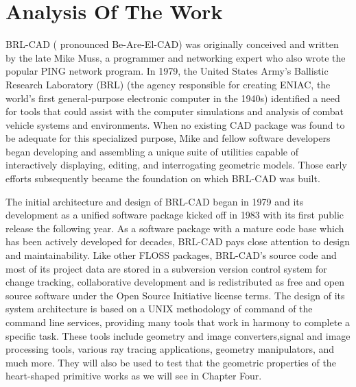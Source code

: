 
\section{Analysis Of The Work}

\hspace{30} BRL­-CAD   (   pronounced   Be­-Are-­El-­CAD)   was   originally   conceived   and  
written   by   the   late   Mike   Muss,   a   programmer   and   networking   expert   who   also  
wrote   the   popular   PING   network   program.   In   1979,   the   United   States   Army's  
Ballistic   Research   Laboratory   (BRL)   (the   agency   responsible   for   creating  
ENIAC,   the   world's   first   general-­purpose   electronic   computer   in   the   1940s)  
identified   a   need   for   tools   that   could   assist   with   the   computer   simulations   and  
analysis   of   combat   vehicle   systems   and   environments.   When   no   existing   CAD  
package   was   found   to   be   adequate   for   this   specialized   purpose,   Mike   and  
fellow   software   developers   began   developing   and   assembling   a   unique   suite   of  
utilities   capable   of   interactively   displaying,   editing,   and   interrogating   geometric  
models.   Those   early   efforts   subsequently   became   the   foundation   on   which  
BRL­-CAD was built.  

\hspace{30} The   initial   architecture   and   design   of   BRL-­CAD   began   in   1979   and   its  
development   as   a   unified   software   package   kicked   off   in   1983   with   its   first  
public   release   the   following   year.   As   a   software   package   with   a   mature   code  
base   which   has   been   actively   developed   for   decades,   BRL-­CAD   pays   close  
attention   to   design   and   maintainability.   Like   other   FLOSS   packages,  
BRL­-CAD's   source   code   and   most   of   its   project   data   are   stored   in   a  
subversion   version   control   system   for   change   tracking,   collaborative  
development   and   is   redistributed   as   free   and   open   source   software   under   the  
Open   Source   Initiative   license   terms.   The   design   of   its   system   architecture   is  
based   on   a   UNIX methodology   of   command   of   the   command ­line   services,  
providing   many   tools   that   work   in   harmony   to   complete   a   specific   task.   These  
tools   include   geometry   and   image   converters,signal   and   image   processing  
tools,   various   ray   tracing   applications, geometry   manipulators,   and   much   more.  
They   will   also   be   used   to   test   that   the   geometric   properties   of   the   heart­-shaped  
primitive works as we will see in Chapter Four.

